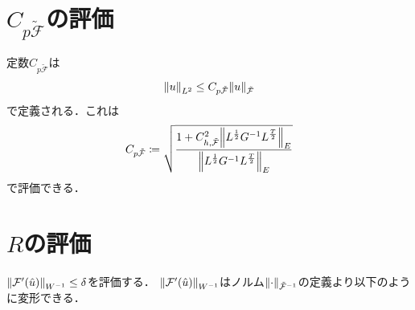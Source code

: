 \section{\(C_{p\tilde{\mathcal{F}}}\)の評価}
定数\(C_{p\tilde{\mathcal{F}}}\)は
\begin{align}
   \norm{u}_{L^2}\leq C_{p\tilde{\mathcal{F}}} \norm{u}_{\tilde{\mathcal{F}}}
\end{align}
で定義される．これは
\begin{align}
  C_{p\tilde{\mathcal{F}}} \coloneqq 
  \sqrt{\dfrac{1+C_{h,\tilde{\mathcal{F}}}^2\norm{L^{\frac{1}{2}}G^{-1}L^{\frac{T}{2}}}_E}{\norm{L^{\frac{1}{2}}G^{-1}L^{\frac{T}{2}}}_E}}
\end{align}
で評価できる．
\section{\(R\)の評価}
\(\norm{\mathcal{F}'(\hat{u})}_{W^{-1}}\leq \delta\)を評価する．
\(\norm{\mathcal{F}'(\hat{u})}_{W^{-1}}\)はノルム\(\norm{\cdot}_{\tilde{\mathcal{F}}^{-1}}\)の定義より以下のように変形できる．


